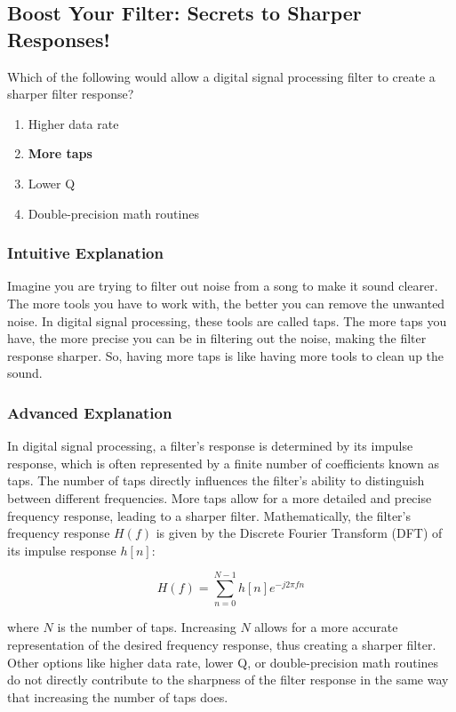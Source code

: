 \subsection{Boost Your Filter: Secrets to Sharper Responses!}

\begin{tcolorbox}[colback=gray!10!white,colframe=black!75!black,title=\textbf{E7F14}]
Which of the following would allow a digital signal processing filter to create a sharper filter response?
\begin{enumerate}[label=\Alph*.]
    \item Higher data rate
    \item \textbf{More taps}
    \item Lower Q
    \item Double-precision math routines
\end{enumerate}
\end{tcolorbox}

\subsubsection{Intuitive Explanation}
Imagine you are trying to filter out noise from a song to make it sound clearer. The more tools you have to work with, the better you can remove the unwanted noise. In digital signal processing, these tools are called taps. The more taps you have, the more precise you can be in filtering out the noise, making the filter response sharper. So, having more taps is like having more tools to clean up the sound.

\subsubsection{Advanced Explanation}
In digital signal processing, a filter's response is determined by its impulse response, which is often represented by a finite number of coefficients known as taps. The number of taps directly influences the filter's ability to distinguish between different frequencies. More taps allow for a more detailed and precise frequency response, leading to a sharper filter. Mathematically, the filter's frequency response \( H(f) \) is given by the Discrete Fourier Transform (DFT) of its impulse response \( h[n] \):

\[
H(f) = \sum_{n=0}^{N-1} h[n] e^{-j2\pi fn}
\]

where \( N \) is the number of taps. Increasing \( N \) allows for a more accurate representation of the desired frequency response, thus creating a sharper filter. Other options like higher data rate, lower Q, or double-precision math routines do not directly contribute to the sharpness of the filter response in the same way that increasing the number of taps does.

